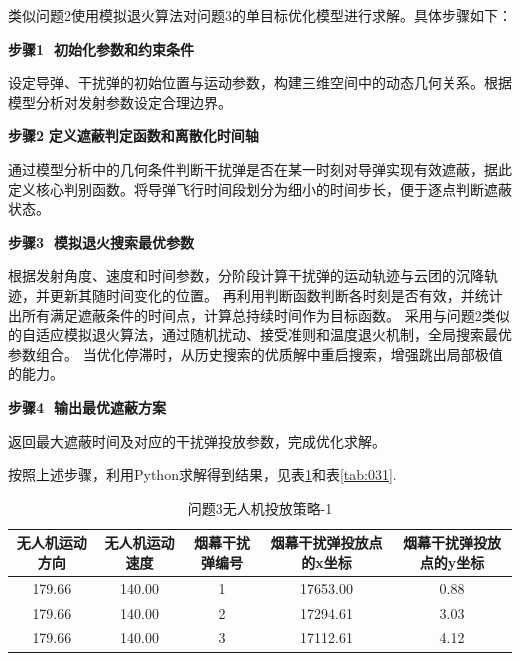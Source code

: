 \documentclass[../main.tex]{subfiles}
\begin{document}

类似问题2使用模拟退火算法对问题3的单目标优化模型进行求解。具体步骤如下：

\noindent\textbf{步骤1 $\,\,$初始化参数和约束条件} 

设定导弹、干扰弹的初始位置与运动参数，构建三维空间中的动态几何关系。根据模型分析对发射参数设定合理边界。

\noindent\textbf{步骤2$\,\,$定义遮蔽判定函数和离散化时间轴}

通过模型分析中的几何条件判断干扰弹是否在某一时刻对导弹实现有效遮蔽，据此定义核心判别函数。将导弹飞行时间段划分为细小的时间步长，便于逐点判断遮蔽状态。

\noindent\textbf{步骤3 $\,\,$模拟退火搜索最优参数} 

根据发射角度、速度和时间参数，分阶段计算干扰弹的运动轨迹与云团的沉降轨迹，并更新其随时间变化的位置。
再利用判断函数判断各时刻是否有效，并统计出所有满足遮蔽条件的时间点，计算总持续时间作为目标函数。
采用与问题2类似的自适应模拟退火算法，通过随机扰动、接受准则和温度退火机制，全局搜索最优参数组合。
当优化停滞时，从历史搜索的优质解中重启搜索，增强跳出局部极值的能力。

\noindent\textbf{步骤4 $\,\,$输出最优遮蔽方案} 

返回最大遮蔽时间及对应的干扰弹投放参数，完成优化求解。

按照上述步骤，利用Python求解得到结果，见表\ref{tab:001}和表\ref{tab:031}.
\begin{table}[H]
\caption{问题3无人机投放策略-1}
\label{tab:001} 
\centering
\begin{small}
\begin{tabular}{ccccc}
\toprule[1.5pt]
无人机运动方向 & 无人机运动速度 & 烟幕干扰弹编号 & 烟幕干扰弹投放点的x坐标& 烟幕干扰弹投放点的y坐标 \\
\midrule[1pt]
  179.66           &140.00                  & 1     & 17653.00                   & 0.88     \\            
  179.66           &140.00                  & 2     & 17294.61                   & 3.03      \\           
  179.66          &140.00                  & 3     & 17112.61                   & 4.12      \\           
\bottomrule[1.5pt]
\end{tabular}
\end{small}
\end{table}
\end{document}
